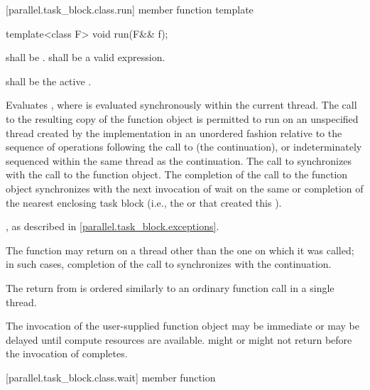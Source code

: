 [parallel.task_block.class.run]{ member function template }

\begin{itemdecl}
template<class F> void run(F&& f);
\end{itemdecl}

\begin{itemdescr}
\pnum
\requires {} shall be .  shall be a valid expression.

\pnum
\preconditions {} shall be the active .

\pnum
\effects Evaluates , where
 is evaluated synchronously within the
current thread. The call to the resulting copy of the function object is
permitted to run on an unspecified thread created by the implementation in an
unordered fashion relative to the sequence of operations following the call to
 (the continuation), or indeterminately sequenced within the same thread
as the continuation. The call to  synchronizes with the call to the function
object. The completion of the call to the function object synchronizes with the
next invocation of wait on the same  or completion of the nearest
enclosing task block (i.e., the  or
     that created this ).

\pnum
\throws {}, as described in \ref{parallel.task_block.exceptions}.

\pnum
\remarks The  function may return on a thread other than the
one on which it was called; in such cases, completion of the call to
 synchronizes with the continuation. \begin{note}The return from
 is ordered similarly to an ordinary function call in a single
thread.\end{note}

\pnum
\remarks The invocation of the user-supplied function object 
may be immediate or may be delayed until compute resources are available.
 might or might not return before the invocation of 
completes.

\end{itemdescr}

[parallel.task_block.class.wait]{ member function }

